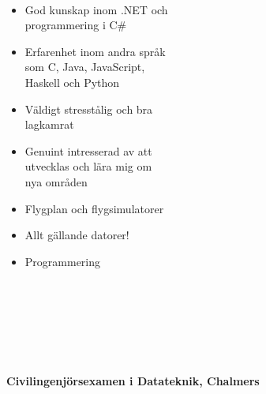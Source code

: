 \documentclass[11pt,oneside,a4paper,titlepage]{article}
\begin{document}
\begin{tcolorbox}
\begin{minipage}[t]{8cm}
\begin{tcolorbox}[grow to left by=15pt,colframe=sup-lgray,colback=sup-lgray,sharp corners]
{\begin{tabular}{l l}
                \end{tabular} \\
                \begin{itemize}
                    \item{God kunskap inom .NET och\\programmering i C\#}
                    \item{Erfarenhet inom andra språk\\som C, Java, JavaScript,\\Haskell och Python}
                    \item{Väldigt stresstålig och bra\\lagkamrat}
                    \item{Genuint intresserad av att\\utvecklas och lära mig om\\nya områden}
                    \vspace*{10pt}
                \end{itemize}
                \begin{itemize}
                    \item{Flygplan och flygsimulatorer}
                    \item{Allt gällande datorer!}
                    \item{Programmering\\\\\\\\\\}
                \end{itemize}
            }            
        \end{tcolorbox}
    \end{minipage}
    \begin{minipage}[t]{12cm}
        \vspace*{-18.2pt}
        \begin{tcolorbox}[grow to left by=-10pt,colframe=white,colback=white,sharp corners]
            {\selectfont
                \\
                \\\textbf{Civilingenjörsexamen i Datateknik, Chalmers} \\
}
\end{tcolorbox}
\end{minipage}
\end{tcolorbox}
\end{document}
